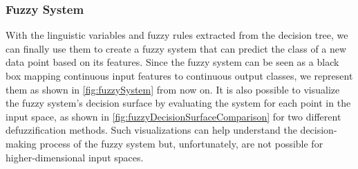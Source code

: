 \subsubsection{Fuzzy System}

With the linguistic variables and fuzzy rules extracted from the decision tree, we can finally use them to create a fuzzy system that can predict the class of a new data point based on its features. Since the fuzzy system can be seen as a black box mapping continuous input features to continuous output classes, we represent them as shown in \autoref{fig:fuzzySystem} from now on. It is also possible to visualize the fuzzy system's decision surface by evaluating the system for each point in the input space, as shown in \autoref{fig:fuzzyDecisionSurfaceComparison} for two different defuzzification methods. Such visualizations can help understand the decision-making process of the fuzzy system but, unfortunately, are not possible for higher-dimensional input spaces.


